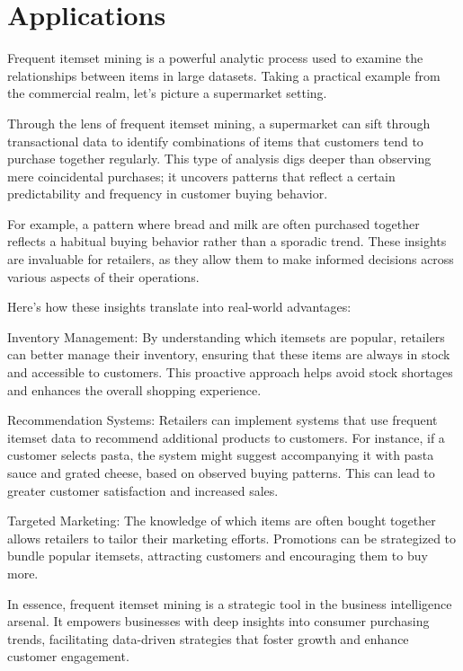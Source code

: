 \section{Applications}
Frequent itemset mining is a powerful analytic process used to examine the relationships between items in large datasets. Taking a practical example from the commercial realm, let's picture a supermarket setting.

Through the lens of frequent itemset mining, a supermarket can sift through transactional data to identify combinations of items that customers tend to purchase together regularly. This type of analysis digs deeper than observing mere coincidental purchases; it uncovers patterns that reflect a certain predictability and frequency in customer buying behavior.

For example, a pattern where bread and milk are often purchased together reflects a habitual buying behavior rather than a sporadic trend. These insights are invaluable for retailers, as they allow them to make informed decisions across various aspects of their operations.

Here's how these insights translate into real-world advantages:

Inventory Management: By understanding which itemsets are popular, retailers can better manage their inventory, ensuring that these items are always in stock and accessible to customers. This proactive approach helps avoid stock shortages and enhances the overall shopping experience.

Recommendation Systems: Retailers can implement systems that use frequent itemset data to recommend additional products to customers. For instance, if a customer selects pasta, the system might suggest accompanying it with pasta sauce and grated cheese, based on observed buying patterns. This can lead to greater customer satisfaction and increased sales.

Targeted Marketing: The knowledge of which items are often bought together allows retailers to tailor their marketing efforts. Promotions can be strategized to bundle popular itemsets, attracting customers and encouraging them to buy more.

In essence, frequent itemset mining is a strategic tool in the business intelligence arsenal. It empowers businesses with deep insights into consumer purchasing trends, facilitating data-driven strategies that foster growth and enhance customer engagement.


